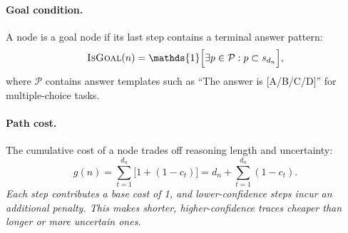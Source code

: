 \documentclass[11pt]{article}
\begin{document}
\paragraph{Goal condition.}
A node is a goal node if its last step contains a terminal answer pattern:
\begin{equation}
\textsc{IsGoal}(n) = \mathds{1}\Big[\exists p \in \mathcal{P}: p \subset s_{d_n}\Big],
\label{eq:isgoal}
\end{equation}
where $\mathcal{P}$ contains answer templates such as ``The answer is [A/B/C/D]'' for multiple-choice tasks.

\paragraph{Path cost.}
The cumulative cost of a node trades off reasoning length and uncertainty:
\begin{equation}
g(n) = \sum_{t=1}^{d_n} \big[1 + (1-c_t)\big]
    = d_n + \sum_{t=1}^{d_n}(1-c_t).
\label{eq:gcost}
\end{equation}
\textit{Each step contributes a base cost of 1, and lower-confidence steps incur an additional penalty. This makes shorter, higher-confidence traces cheaper than longer or more uncertain ones.}





\end{document}
